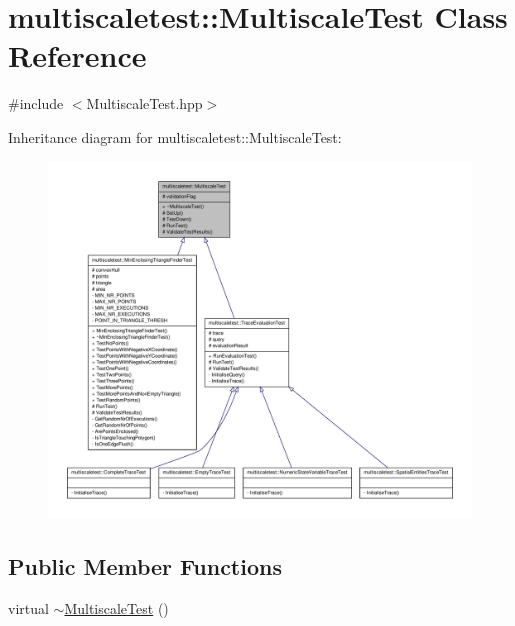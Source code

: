 \hypertarget{classmultiscaletest_1_1MultiscaleTest}{\section{multiscaletest\-:\-:\-Multiscale\-Test \-Class \-Reference}
\label{classmultiscaletest_1_1MultiscaleTest}
}


{\ttfamily \#include $<$\-Multiscale\-Test.\-hpp$>$}



\-Inheritance diagram for multiscaletest\-:\-:\-Multiscale\-Test\-:
\nopagebreak
\begin{figure}[H]
\begin{center}
\leavevmode
\includegraphics[width=350pt]{classmultiscaletest_1_1MultiscaleTest__inherit__graph}
\end{center}
\end{figure}
\subsection*{\-Public \-Member \-Functions}
\begin{DoxyCompactItemize}
\item 
virtual \hyperlink{classmultiscaletest_1_1MultiscaleTest_a27aa0fd218670e2265edad84b2fb1f8f}{$\sim$\-Multiscale\-Test} ()
\end{DoxyCompactItemize}
